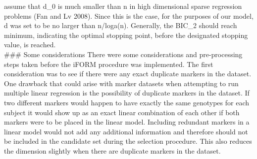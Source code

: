 \documentclass[]{book}
\theoremstyle{definition}
\theoremstyle{definition}
\theoremstyle{remark}
\begin{document}
assume that d\_0 is much smaller than n in high dimensional sparse
regression problems (Fan and Lv 2008). Since this is the case, for the
purposes of our model, d was set to be no larger than n/loga(n).
Generally, the BIC\_2 should reach minimum, indicating the optimal
stopping point, before the designated stopping value, is reached.\\
\#\#\# Some considerations There were some considerations and
pre-processing steps taken before the iFORM procedure was implemented.
The first consideration was to see if there were any exact duplicate
markers in the dataset. One drawback that could arise with marker
datasets when attempting to run multiple linear regression is the
possibility of duplicate markers in the dataset. If two different
markers would happen to have exactly the same genotypes for each subject
it would show up as an exact linear combination of each other if both
markers were to be placed in the linear model. Including redundant
markers in a linear model would not add any additional information and
therefore should not be included in the candidate set during the
selection procedure. This also reduces the dimension slightly when there
are duplicate markers in the dataset.
\end{document}
